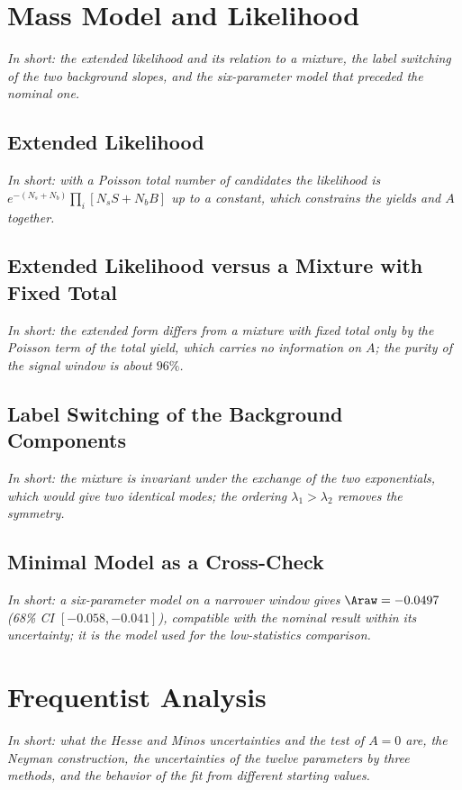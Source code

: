 \FloatBarrier

\section{Mass Model and Likelihood}
\label{app:model}
\emph{In short: the extended likelihood and its relation to a mixture, the label switching of the two background slopes, and the six-parameter model that preceded the nominal one.}
\subsection{Extended Likelihood}
\label{app:likelihood}
\emph{In short: with a Poisson total number of candidates the likelihood is $e^{-(N_s+N_b)}\prod_i[N_s S+N_b B]$ up to a constant, which constrains the yields and $A$ together.}

\subsection{Extended Likelihood versus a Mixture with Fixed Total}
\emph{In short: the extended form differs from a mixture with fixed total only by the Poisson term of the total yield, which carries no information on $A$; the purity of the signal window is about $96\%$.}

\subsection{Label Switching of the Background Components}
\emph{In short: the mixture is invariant under the exchange of the two exponentials, which would give two identical modes; the ordering $\lambda_1>\lambda_2$ removes the symmetry.}

\subsection{Minimal Model as a Cross-Check}
\label{sec:bayes_minimal}
\emph{In short: a six-parameter model on a narrower window gives $\Araw=-0.0497$ (68\% CI $[-0.058,-0.041]$), compatible with the nominal result within its uncertainty; it is the model used for the low-statistics comparison.}

\FloatBarrier

\section{Frequentist Analysis}
\label{app:freq}
\emph{In short: what the Hesse and Minos uncertainties and the test of $A=0$ are, the Neyman construction, the uncertainties of the twelve parameters by three methods, and the behavior of the fit from different starting values.}
